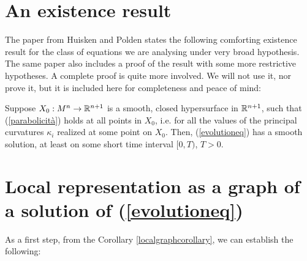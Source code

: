 \section{An existence result}
The paper from Huisken and Polden \cite{huisken} states the following comforting existence result for the class of equations we are analysing under very broad hypothesis. The same paper also includes a proof of the result with some more restrictive hypotheses. A complete proof is quite more involved. We will not use it, nor prove it, but it is included here for completeness and peace of mind: 

\begin{theorem}
	Suppose $X_0 : M^n \rightarrow \mathbb{R}^{n+1}$ is a smooth, closed hypersurface in $\mathbb{R}^{n+1}$, such that (\ref{parabolicità}) holds at all points in $X_0$, i.e. for all the values of the principal curvatures $\kappa_{i}$ realized at some point on $X_0$. Then, (\ref{evolutioneq}) has a smooth solution, at least on some short time interval $[0, T)$, $T > 0$.  \label{existence}
\end{theorem}



\section{Local representation as a graph of a solution of (\ref{evolutioneq})}
As a first step, from the Corollary \ref{localgraphcorollary}, we can establish the following:

